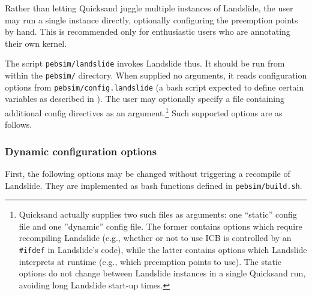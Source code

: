 Rather than letting Quicksand juggle multiple instances of Landslide,
the user may run a single instance directly, optionally configuring the preemption points by hand.
This is recommended only for enthusiastic users who are annotating their own kernel.

The script {\tt pebsim/landslide} invokes Landslide thus.
It should be run from within the {\tt pebsim/} directory.
When supplied no arguments, it reads configuration options from {\tt pebsim/config.landslide}
(a bash script expected to define certain variables as described in \sect{\ref{sec:landslide-glue}}).
The user may optionally specify a file containing additional config directives
as an argument.\footnote{
Quicksand actually supplies two such files as arguments: one ``static'' config file and one ''dynamic'' config file.
The former contains options which require recompiling Landslide (e.g., whether or not to use ICB is controlled by an {\tt \#ifdef} in Landslide's code),
while the latter contains options which Landslide interprets at runtime (e.g., which preemption points to use).
The static options do not change between Landslide instances in a single Quicksand run,
avoiding long Landslide start-up times.
}
Such supported options are as follows.

\subsubsection{Dynamic configuration options}
First, the following options may be changed without triggering a recompile of Landslide.
They are implemented as bash functions defined in {\tt pebsim/build.sh}.

